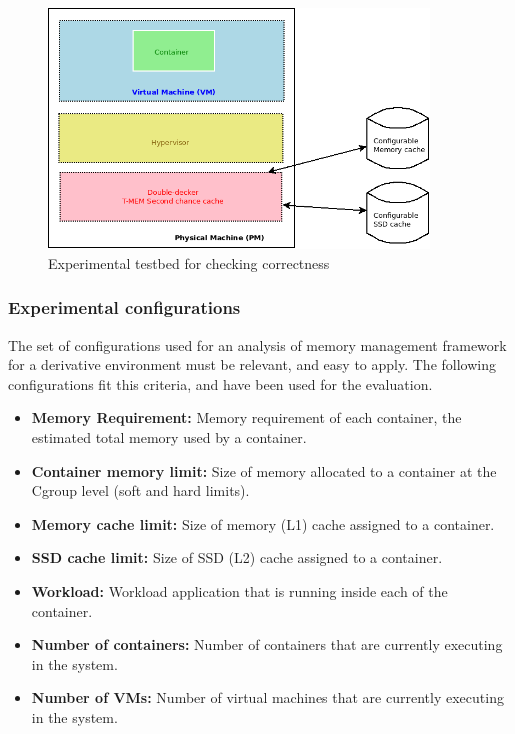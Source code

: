 	
	\begin{figure}
	  \centering
	  \includegraphics[width=0.9\textwidth]{images/correctness/exp_setup.png}
	  \caption{Experimental testbed for checking correctness}
	  \label{img:correctness_testbed}
	\end{figure}
	
      \subsubsection{Experimental configurations}	
	The set of configurations used for an analysis of memory management framework for a derivative environment 
	must be relevant, and easy to apply. The following configurations
fit this criteria, and have been used for the evaluation.

	  \begin{itemize}
	   \item \textbf{Memory Requirement:} Memory requirement of each container, the estimated total memory used by a container.
	   
	   \item \textbf{Container memory limit:} Size of memory allocated to a container at the Cgroup level (soft and hard limits). 
	   \item \textbf{Memory cache limit:} Size of memory (L1) cache assigned to a container. 
	   \item \textbf{SSD cache limit:} Size of SSD (L2) cache assigned to a container.
	   
	   \item \textbf{Workload:} Workload application that is running inside each of the container. 
	   \item \textbf{Number of containers:} Number of containers that are currently executing in the system.
	   \item \textbf{Number of VMs:} Number of virtual machines that are currently executing in the system.
	  \end{itemize}	  
	  
